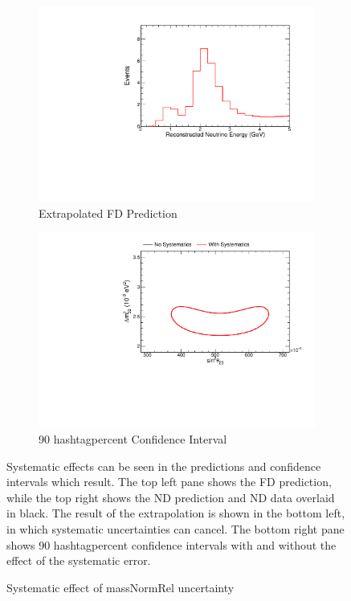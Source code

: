 {\begin{figure}
\begin{center}
\begin{subfigure}[c]{0.49\textwidth}
\includegraphics[width=\textwidth]{figures/systs/prediction/fd_extrap_prediction_massNormRel.pdf}
\caption*{Extrapolated FD Prediction}
\end{subfigure}
\begin{subfigure}[c]{0.49\textwidth}
\includegraphics[width=\textwidth]{figures/systs/prediction/fd_extrap_contour_massNormRel.pdf}
\caption*{90 hashtagpercent Confidence Interval}
\end{subfigure}
\end{center}
\caption{Systematic effect of massNormRel uncertainty}{
Systematic effects can be seen in the predictions and confidence intervals
which result.
The top left pane shows the FD prediction, while the top right shows the
ND prediction and ND data overlaid in black.
The result of the extrapolation is shown in the bottom left, in which
systematic uncertainties can cancel.
The bottom right pane shows 90 hashtagpercent confidence intervals with and without
the effect of the systematic error.}
\label{syst_fig_massNormRel}


\end{figure}}
